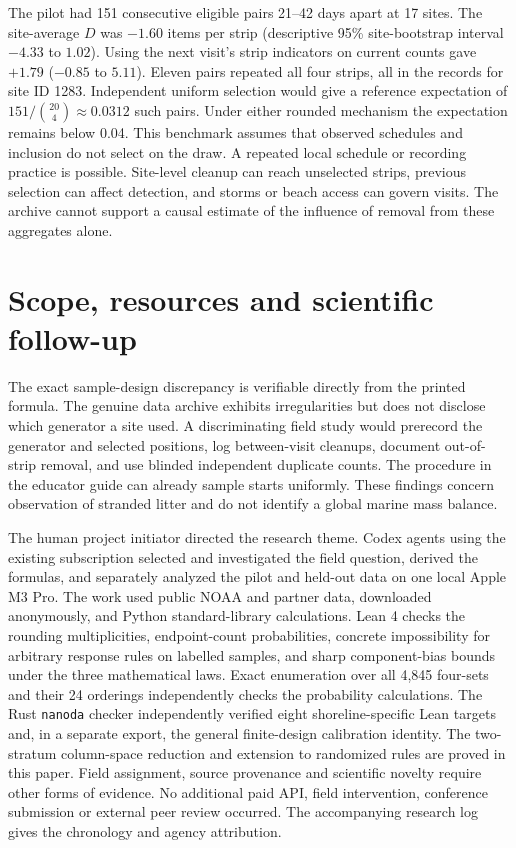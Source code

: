 \documentclass[10pt]{article}
\begin{document}
The pilot had 151 consecutive eligible pairs 21--42 days apart at 17 sites. The site-average $D$ was $-1.60$ items per strip (descriptive 95\% site-bootstrap interval $-4.33$ to $1.02$). Using the next visit's strip indicators on current counts gave $+1.79$ ($-0.85$ to $5.11$). Eleven pairs repeated all four strips, all in the records for site ID 1283. Independent uniform selection would give a reference expectation of $151/{20\choose4}\approx0.0312$ such pairs. Under either rounded mechanism the expectation remains below 0.04. This benchmark assumes that observed schedules and inclusion do not select on the draw. A repeated local schedule or recording practice is possible. Site-level cleanup can reach unselected strips, previous selection can affect detection, and storms or beach access can govern visits. The archive cannot support a causal estimate of the influence of removal from these aggregates alone.

\section{Scope, resources and scientific follow-up}
The exact sample-design discrepancy is verifiable directly from the printed formula. The genuine data archive exhibits irregularities but does not disclose which generator a site used. A discriminating field study would prerecord the generator and selected positions, log between-visit cleanups, document out-of-strip removal, and use blinded independent duplicate counts. The procedure in the educator guide can already sample starts uniformly. These findings concern observation of stranded litter and do not identify a global marine mass balance.

The human project initiator directed the research theme. Codex agents using the existing subscription selected and investigated the field question, derived the formulas, and separately analyzed the pilot and held-out data on one local Apple M3 Pro. The work used public NOAA and partner data, downloaded anonymously, and Python standard-library calculations. Lean 4 checks the rounding multiplicities, endpoint-count probabilities, concrete impossibility for arbitrary response rules on labelled samples, and sharp component-bias bounds under the three mathematical laws. Exact enumeration over all 4,845 four-sets and their 24 orderings independently checks the probability calculations. The Rust \texttt{nanoda} checker independently verified eight shoreline-specific Lean targets and, in a separate export, the general finite-design calibration identity. The two-stratum column-space reduction and extension to randomized rules are proved in this paper. Field assignment, source provenance and scientific novelty require other forms of evidence. No additional paid API, field intervention, conference submission or external peer review occurred. The accompanying research log gives the chronology and agency attribution.
\end{document}
